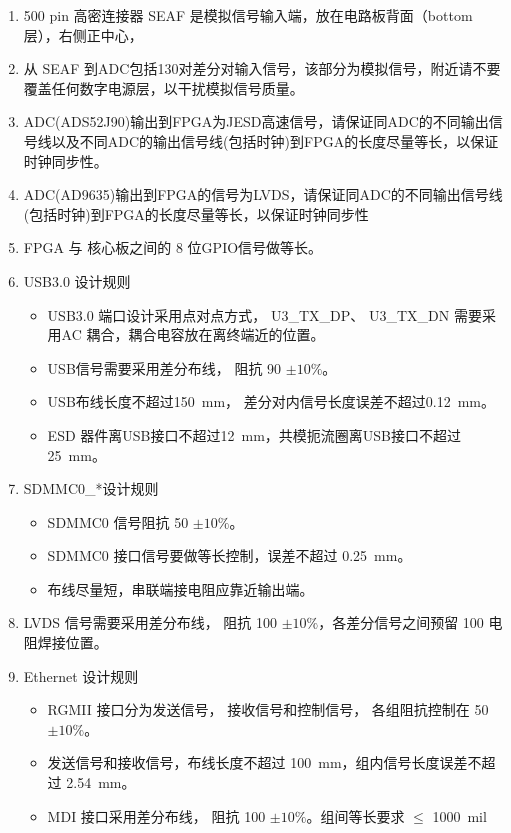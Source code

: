 \begin{enumerate}
  \item 500 pin 高密连接器 SEAF 是模拟信号输入端，放在电路板背面（bottom 层），右侧正中心，
  \item 从 SEAF 到ADC包括130对差分对输入信号，该部分为模拟信号，附近请不要覆盖任何数字电源层，以干扰模拟信号质量。
  \item ADC(ADS52J90)输出到FPGA为JESD高速信号，请保证同ADC的不同输出信号线以及不同ADC的输出信号线(包括时钟)到FPGA的长度尽量等长，以保证时钟同步性。
  \item ADC(AD9635)输出到FPGA的信号为LVDS，请保证同ADC的不同输出信号线(包括时钟)到FPGA的长度尽量等长，以保证时钟同步性
  \item FPGA 与 核心板之间的 8 位GPIO信号做等长。
  \item USB3.0 设计规则
  \begin{itemize}
    \item USB3.0 端口设计采用点对点方式， U3\_TX\_DP、 U3\_TX\_DN 需要采用AC 耦合，耦合电容放在离终端近的位置。
    \item USB信号需要采用差分布线， 阻抗 \SI{90}{\upOmega} $\pm 10\%$。
    \item USB布线长度不超过\SI{150}{mm}， 差分对内信号长度误差不超过\SI{0.12}{mm}。
    \item ESD 器件离USB接口不超过\SI{12}{mm}，共模扼流圈离USB接口不超过\SI{25}{mm}。
  \end{itemize}
  \item SDMMC0\_*设计规则
  \begin{itemize}
    \item SDMMC0 信号阻抗 \SI{50}{\upOmega} $\pm 10 \%$。
    \item SDMMC0 接口信号要做等长控制，误差不超过 \SI{0.25}{mm}。
    \item 布线尽量短，串联端接电阻应靠近输出端。
  \end{itemize}
  \item LVDS 信号需要采用差分布线， 阻抗 \SI{100}{\upOmega} $\pm 10\%$，各差分信号之间预留 \SI{100}{\upOmega} 电阻焊接位置。
  \item Ethernet 设计规则
  \begin{itemize}
    \item RGMII 接口分为发送信号， 接收信号和控制信号， 各组阻抗控制在 \SI{50}{\upOmega} $\pm 10\%$。
    \item 发送信号和接收信号，布线长度不超过 \SI{100}{mm}，组内信号长度误差不超过 \SI{2.54}{mm}。
    \item MDI 接口采用差分布线， 阻抗 \SI{100}{\upOmega} $\pm 10\%$。组间等长要求 $\leq$ \SI{1000}{mil}

\end{itemize}
\end{enumerate}
